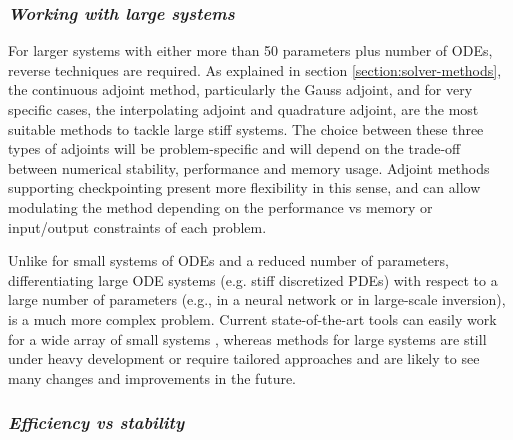 \subsubsection*{\textit{Working with large systems}}

For larger systems with either more than 50 parameters plus number of ODEs, reverse techniques are required. 
As explained in section \ref{section:solver-methods}, the continuous adjoint method, particularly the Gauss adjoint, and for very specific cases, the interpolating adjoint and quadrature adjoint, are the most suitable methods to tackle large stiff systems. 
The choice between these three types of adjoints will be problem-specific and will depend on the trade-off between numerical stability, performance and memory usage. 
Adjoint methods supporting checkpointing present more flexibility in this sense, and can allow modulating the method depending on the performance vs memory or input/output constraints of each problem. 

Unlike for small systems of ODEs and a reduced number of parameters, differentiating large ODE systems (e.g. stiff discretized PDEs) with respect to a large number of parameters (e.g., in a neural network or in large-scale inversion), is a much more complex problem. 
Current state-of-the-art tools can easily work for a wide array of small systems \cite{rackauckas2020universal}, whereas methods for large systems are still under heavy development or require tailored approaches and are likely to see many changes and improvements in the future.


\subsubsection*{\textit{Efficiency vs stability}}


